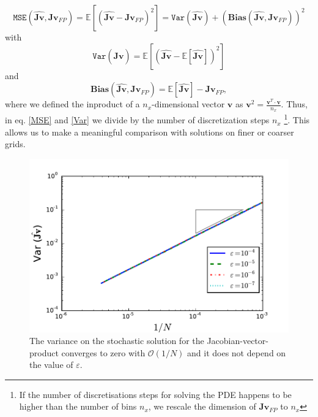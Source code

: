 \documentclass[]{article}
\newcommand{\V}{\ensuremath{\mathbf{v}}}
\newcommand{\jv}{\ensuremath{\mathbf{\hat{Jv}}}}
\newcommand{\jvpde}{\ensuremath{\mathbf{Jv}_{FP}}}
\begin{document}
\begin{equation} \label{MSE}
\texttt{MSE}(\jv, \jvpde ) =  \mathbb{E} \left[   \left(  \jv - \jvpde  \right)^2 \right]  =   \texttt{Var}(\jv) +  \left( \mathbf{Bias}(\jv, \jvpde )  \right)^2
\end{equation}
with 
\begin{equation} \label{Var}
 \texttt{Var}(\jv) =  \mathbb{E} \left[   \left(  \jv - \mathbb{E}[\jv]   \right)^2 \right] 
\end{equation}
and 
\begin{equation} 
 \mathbf{Bias}(\jv, \jvpde ) = \mathbb{E}[\jv]  - \jvpde ,
\end{equation}
where we defined the inproduct of a $n_x$-dimensional vector $\V$ as $\mathbf{v}^2 = \frac{\V^T \cdot \V}{n_x}$. Thus, in eq. \eqref{MSE} and \eqref{Var} we divide by the number of discretization steps $n_x$ \footnote{If the number of discretisations steps for solving the PDE happens to be  higher than the number of bins $n_x$, we rescale the dimension of $\jvpde$ to $n_x$}. This allows us to make a meaningful comparison with solutions on finer or coarser grids. 




\begin{figure}
\includegraphics[width=14.5cm]{../Problems/WeightedParticles/checkSystem/plots/Var_N_eps}
\caption{The variance on the stochastic solution for the Jacobian-vector-product converges to zero with $\mathcal{O}(1/ N)$ and it does not depend on the value of $\varepsilon$.}
\label{Var_N}
\end{figure}
\end{document}
